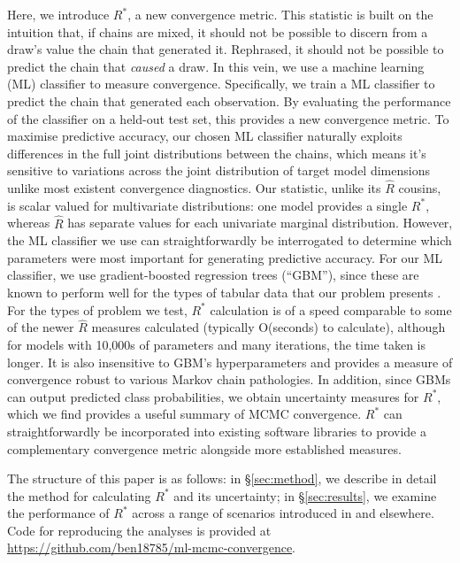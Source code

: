 \documentclass{article}
\begin{document}
Here, we introduce $R^*$, a new convergence metric. This statistic is built on the intuition that, if chains are mixed, it should not be possible to discern from a draw's value the chain that generated it. Rephrased, it should not be possible to predict the chain that \textit{caused} a draw. In this vein, we use a machine learning (ML) classifier to measure convergence. Specifically, we train a ML classifier to predict the chain that generated each observation. By evaluating the performance of the classifier on a held-out test set, this provides a new convergence metric. To maximise predictive accuracy, our chosen ML classifier naturally exploits differences in the full joint distributions between the chains, which means it's sensitive to variations across the joint distribution of target model dimensions unlike most existent convergence diagnostics. Our statistic, unlike its $\widehat{R}$ cousins, is scalar valued for multivariate distributions: one model provides a single $R^*$, whereas $\widehat{R}$ has separate values for each univariate marginal distribution. However, the ML classifier we use can straightforwardly be interrogated to determine which parameters were most important for generating predictive accuracy. For our ML classifier, we use gradient-boosted regression trees \citep{friedman2001greedy,greenwell2019package} (``GBM''), since these are known to perform well for the types of tabular data that our problem presents \citep{chollet2018}. For the types of problem we test, $R^*$ calculation is of a speed comparable to some of the newer $\widehat{R}$ measures calculated (typically O(seconds) to calculate), although for models with 10,000s of parameters and many iterations, the time taken is longer. It is also insensitive to GBM's hyperparameters and provides a measure of convergence robust to various Markov chain pathologies. In addition, since GBMs can output predicted class probabilities, we obtain uncertainty measures for $R^*$, which we find provides a useful summary of MCMC convergence. $R^*$ can straightforwardly be incorporated into existing software libraries to provide a complementary convergence metric alongside more established measures.

The structure of this paper is as follows: in \S\ref{sec:method}, we describe in detail the method for calculating $R^*$ and its uncertainty; in \S\ref{sec:results}, we examine the performance of $R^*$ across a range of scenarios introduced in \citep{vehtari2019rank} and elsewhere. Code for reproducing the analyses is provided at \url{https://github.com/ben18785/ml-mcmc-convergence}.
\end{document}
